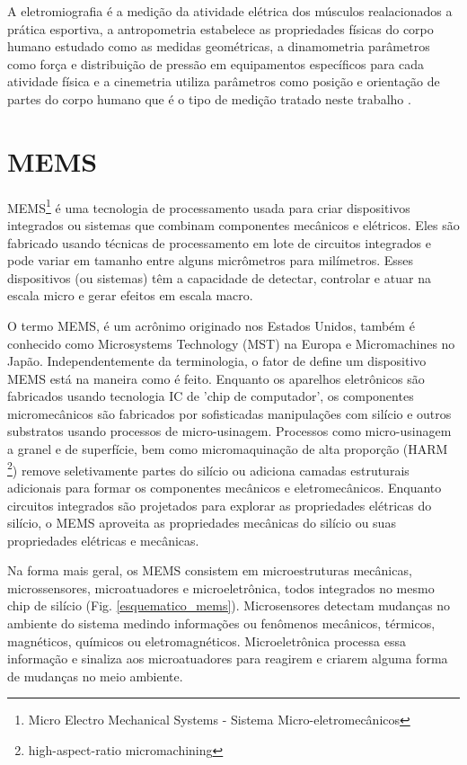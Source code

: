 A eletromiografia é a medição da atividade elétrica dos músculos realacionados a prática esportiva, a antropometria estabelece as propriedades físicas do corpo humano estudado como as medidas geométricas, a dinamometria parâmetros como força e distribuição de pressão em equipamentos específicos para cada atividade física e a cinemetria utiliza parâmetros como posição e orientação de partes do corpo humano que é o tipo de medição tratado neste trabalho \cite{amadio2007}\cite{medeiros2013}.
	
	\section{MEMS}

		MEMS\footnote{Micro Electro Mechanical Systems - Sistema Micro-eletromecânicos}  é uma tecnologia de processamento usada para criar dispositivos integrados ou sistemas que combinam componentes mecânicos e elétricos. Eles são fabricado usando técnicas de processamento em lote de circuitos integrados e pode variar em tamanho entre alguns micrômetros para milímetros. Esses dispositivos (ou sistemas) têm a capacidade de detectar, controlar e atuar na escala micro e gerar efeitos em escala macro\cite{prime2002}. 

		O termo MEMS, é um acrônimo originado nos Estados Unidos, também é conhecido como Microsystems Technology (MST) na Europa e Micromachines no Japão. Independentemente da terminologia, o fator de define um dispositivo MEMS está na maneira como é feito. Enquanto os aparelhos eletrônicos são fabricados usando tecnologia IC de 'chip de computador', os componentes micromecânicos são fabricados por sofisticadas manipulações com silício e outros substratos usando processos de micro-usinagem. Processos como micro-usinagem a granel e de superfície, bem como micromaquinação de alta proporção (HARM \footnote{high-aspect-ratio micromachining}) remove seletivamente partes do silício ou adiciona camadas estruturais adicionais para formar os componentes mecânicos e eletromecânicos. Enquanto circuitos integrados são projetados para explorar as propriedades elétricas do silício, o MEMS aproveita as propriedades mecânicas do silício ou suas propriedades elétricas e mecânicas\cite{prime2002}.

		Na forma mais geral, os MEMS consistem em microestruturas mecânicas, microssensores, microatuadores e microeletrônica, todos integrados no mesmo chip de silício (Fig. \ref{esquematico_mems}). Microsensores detectam mudanças no ambiente do sistema medindo informações ou fenômenos mecânicos, térmicos, magnéticos, químicos ou eletromagnéticos. Microeletrônica processa essa informação e sinaliza aos microatuadores para reagirem e criarem alguma forma de mudanças no meio ambiente\cite{prime2002}.

